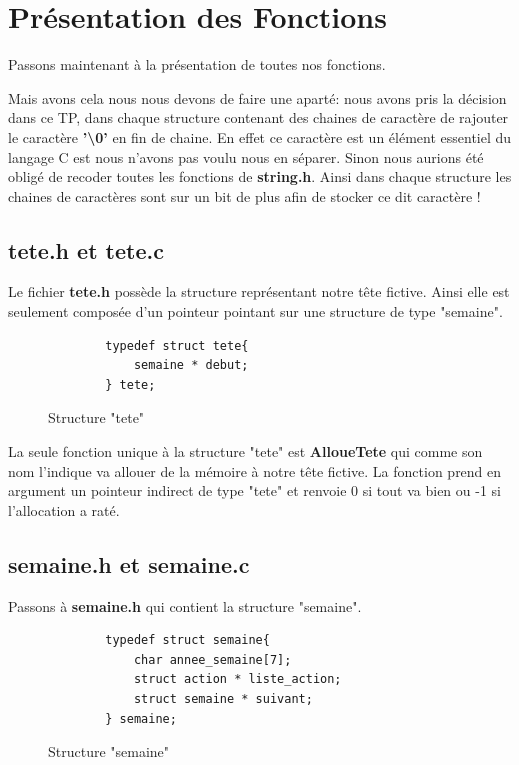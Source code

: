 \documentclass[12pt,french]{article} %
\begin{document}
\section{Présentation des Fonctions}
Passons maintenant à la présentation de toutes nos fonctions.\newline

Mais avons cela nous nous devons de faire une aparté: nous avons pris la décision dans ce TP, dans chaque structure contenant des chaines de caractère de rajouter le caractère \textbf{'\textbackslash0'} en fin de chaine. En effet ce caractère est un élément essentiel du langage C est nous n'avons pas voulu nous en séparer. Sinon nous aurions été obligé de recoder toutes les fonctions de \textbf{string.h}. Ainsi dans chaque structure les chaines de caractères sont sur un bit de plus afin de stocker ce dit caractère !

\subsection{tete.h et tete.c}

Le fichier \textbf{tete.h} possède la structure représentant notre tête fictive. Ainsi elle est seulement composée d'un pointeur pointant sur une structure de type "semaine".\newline

\begin{figure}[H]
	\begin{lstlisting}
		typedef struct tete{
			semaine * debut;
		} tete;
	\end{lstlisting}
	\caption{Structure "tete"}
\end{figure}

La seule fonction unique à la structure "tete" est \textbf{AlloueTete} qui comme son nom l'indique va allouer de la mémoire à notre tête fictive. La fonction prend en argument un pointeur indirect de type "tete" et renvoie 0 si tout va bien ou -1 si l'allocation a raté.

\subsection{semaine.h et semaine.c}

Passons à \textbf{semaine.h} qui contient la structure "semaine".


\begin{figure}[H]
	\begin{lstlisting}
		typedef struct semaine{
			char annee_semaine[7];
			struct action * liste_action;
			struct semaine * suivant;
		} semaine;
	\end{lstlisting}
	\caption{Structure "semaine"}
\end{figure}
\end{document}
